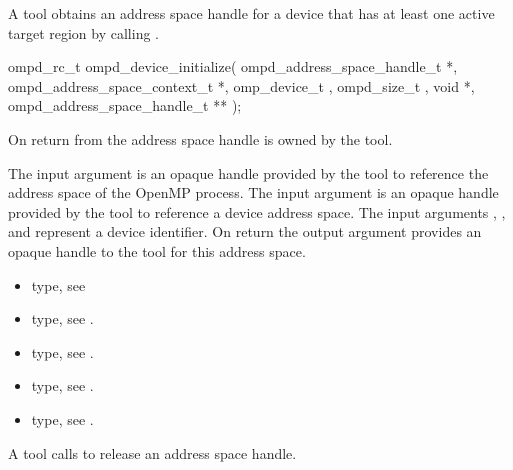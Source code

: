\label{subsubsubsec:ompd_device_initialize}
\summary
A tool obtains an address space handle for a device that has
at least one active target region by calling
.

\format

\begin{cspecific}
\begin{ompSyntax}
ompd_rc_t ompd_device_initialize(
  ompd_address_space_handle_t *,
  ompd_address_space_context_t *,
  omp_device_t ,
  ompd_size_t ,
  void *,
  ompd_address_space_handle_t **
);
\end{ompSyntax}
\end{cspecific}


\descr
On return from  the address
space handle is owned by the tool.

\argdesc

The input argument  is an opaque handle provided by the tool
to reference the address space of the OpenMP process.
The input argument  is an opaque handle provided by the tool
to reference a device address space.
The input arguments ,  , and  represent a device identifier.
On return the output argument  provides an opaque handle to the
tool for this address space.

\crossreferences
\begin{itemize}
	\item {} type, see 
	\item {} type, see .
	\item {} type, see .
	\item {} type, see .
	\item {} type, see .
\end{itemize}




\label{subsubsubsec:ompd_release_address_space_handle}
\summary
A tool calls  to release an address space
handle.

